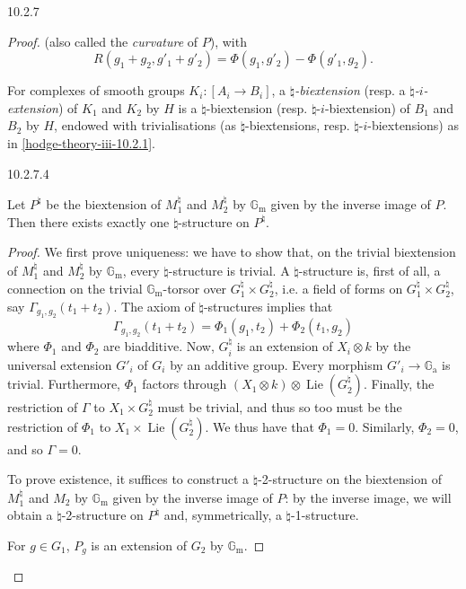 \begin{construction}{10.2.7}
\begin{proof}
        (also called the \emph{curvature} of \(P\)), with
        \[           R(g_1+g_2, g'_1+g'_2)           = \Phi (g_1,g'_2) - \Phi (g'_1,g_2).         \]\par{}For complexes of smooth groups \(K_i\colon [A_i\to  B_i]\), a \emph{\(\natural \)-biextension} (resp. a \emph{\(\natural \)-\(i\)-extension}) of \(K_1\) and \(K_2\) by \(H\) is a \(\natural \)-biextension (resp. \(\natural \)-\(i\)-biextension) of \(B_1\) and \(B_2\) by \(H\), endowed with trivialisations (as \(\natural \)-biextensions, resp. \(\natural \)-\(i\)-biextensions) as in \cref{hodge-theory-iii-10.2.1}.\begin{proposition}{10.2.7.4}\label{hodge-theory-iii-10.2.7.4}\skipsinglepar\par{}Let \(P^\natural \) be the biextension of \(M_1^\natural \) and \(M_2^\natural \) by \(\mathbb {G}_\mathrm {m}\) given by the inverse image of \(P\).
        Then there exists exactly one \(\natural \)-structure on \(P^\natural \).\begin{proof}\par{}We first prove uniqueness: we have to show that, on the trivial biextension of \(M_1^\natural \) and \(M_2^\natural \) by \(\mathbb {G}_\mathrm {m}\), every \(\natural \)-structure is trivial.
          A \(\natural \)-structure is, first of all, a connection on the trivial \(\mathbb {G}_\mathrm {m}\)-torsor over \(G_1^\natural \times  G_2^\natural \), i.e. a field of forms on \(G_1^\natural \times  G_2^\natural \), say \(\Gamma _{g_1,g_2}(t_1+t_2)\).
          The axiom of \(\natural \)-structures implies that
          \[             \Gamma _{g_1,g_2}(t_1+t_2)             = \Phi _1(g_1,t_2) + \Phi _2(t_1,g_2)           \]
          where \(\Phi _1\) and \(\Phi _2\) are biadditive.
          Now, \(G_i^\natural \) is an extension of \(X_i\otimes  k\) by the universal extension \(G'_i\) of \(G_i\) by an additive group.
          Every morphism \(G'_i\to \mathbb {G}_\mathrm {a}\) is trivial.
          Furthermore, \(\Phi _1\) factors through \((X_1\otimes  k)\otimes \operatorname {Lie}(G_2^\natural )\).
          Finally, the restriction of \(\Gamma \) to \(X_1\times  G_2^\natural \) must be trivial, and thus so too must be the restriction of \(\Phi _1\) to \(X_1\times \operatorname {Lie}(G_2^\natural )\).
          We thus have that \(\Phi _1=0\).
          Similarly, \(\Phi _2=0\), and so \(\Gamma =0\).\par{}To prove existence, it suffices to construct a \(\natural \)-2-structure on the biextension of \(M_1^\natural \) and \(M_2\) by \(\mathbb {G}_\mathrm {m}\) given by the inverse image of \(P\): by the inverse image, we will obtain a \(\natural \)-2-structure on \(P^\natural \) and, symmetrically, a \(\natural \)-1-structure.\par{}For \(g\in  G_1\), \(P_g\) is an extension of \(G_2\) by \(\mathbb {G}_\mathrm {m}\).

\end{proof}
\end{proposition}
\end{proof}
\end{construction}

